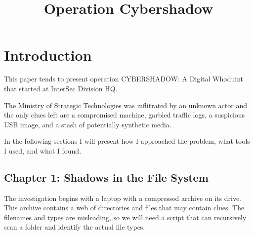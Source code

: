 \documentclass[pdflatex,sn-mathphys-num]{sn-jnl}
\begin{document}
\title[Operation Cybershadow]{Operation Cybershadow}

\author*{ }




\maketitle

\section{Introduction}\label{introduction}

\par This paper tends to present operation CYBERSHADOW\@: A Digital Whoduint that started at InterSec Division HQ.

\par The Ministry of Strategic Technologies was inflitrated by an unknown actor and the only clues left are a
compromised machine, garbled traffic logs, a suspicious USB image, and a stash of potentially synthetic media.

\par In the following sections I will present how I approached the problem, what tools I used, and what I found.

\subsection{Chapter 1: Shadows in the File System}\label{chapter1_introduction}

\par The investigation begins with a laptop with a compressed archive on its drive. This archive contains a web of
directories and files that may contain clues. The filenames and types are misleading, so we will need a script that can
recursively scan a folder and identify the actual file types.
\end{document}
